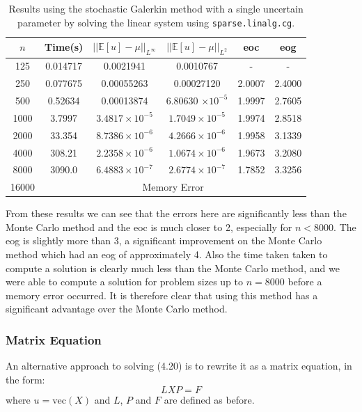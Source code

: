 \documentclass[11pt]{article}
\numberwithin{equation}{section}
\begin{document}
\begin{table}[H]
\centering
\begin{tabular}{|c|c|c|c|c|c|}
\hline
$n$ & Time(s) & $|| \mathbb{E}[u] - \mu ||_{L^{\infty}}$ & $|| \mathbb{E}[u] - \mu ||_{L^{2}}$ & eoc & eog \\
\hline
125 & 0.014717 & 0.0021941 & 0.0010767 & - & - \\
250 & 0.077675 & 0.00055263 & 0.00027120 & 2.0007 & 2.4000 \\
500 & 0.52634 & 0.00013874 & 6.80630 $\times 10^{-5}$ & 1.9997 & 2.7605 \\
1000 & 3.7997 & $3.4817 \times 10^{-5}$ & $1.7049 \times 10^{-5}$ & 1.9974 & 2.8518  \\
2000 & 33.354 & $8.7386 \times 10^{-6}$ & $4.2666 \times 10^{-6}$ & 1.9958 & 3.1339 \\
4000 & 308.21 & $2.2358 \times 10^{-6}$ & $1.0674 \times 10^{-6}$ & 1.9673 & 3.2080 \\
8000 & 3090.0 & $6.4883 \times 10^{-7}$ & $2.6774 \times 10^{-7}$ & 1.7852 & 3.3256 \\
\cline{2-6}
16000 & \multicolumn{5}{c|}{Memory Error} \\
\hline
\end{tabular}
\captionsetup{justification=centering}
\caption{Results using the stochastic Galerkin method with a single uncertain parameter by solving the linear system using \texttt{sparse.linalg.cg}.}
\label{table:stochastic linear}
\end{table}

From these results we can see that the errors here are significantly less than the Monte Carlo method and the eoc is much closer to 2, especially for $n<8000$. The eog is slightly more than 3, a significant improvement on the Monte Carlo method which had an eog of approximately 4. Also the time taken taken to compute a solution is clearly much less than the Monte Carlo method, and we were able to compute a solution for problem sizes up to $n=8000$ before a memory error occurred. It is therefore clear that using this method has a significant advantage over the Monte Carlo method.

\subsubsection*{Matrix Equation}
An alternative approach to solving (4.20) is to rewrite it as a matrix equation, in the form:
\begin{equation}
LXP = F
\end{equation} 
where $u = \text{vec}(X)$ and $L$, $P$ and $F$ are defined as before. 
\end{document}
